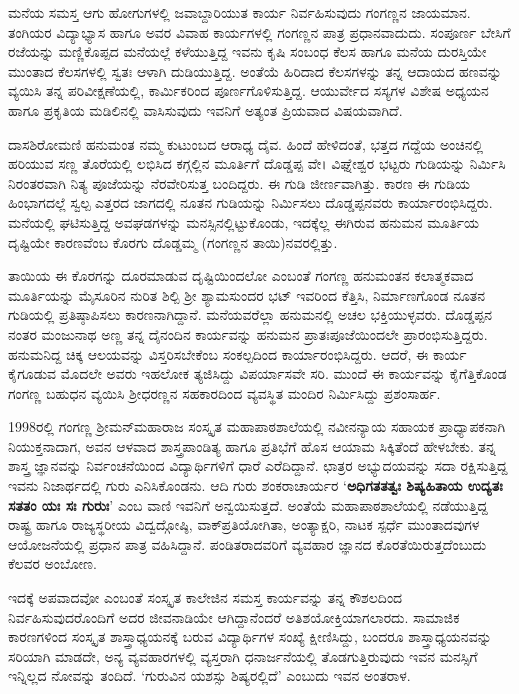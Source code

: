 {ಮನೆಯ ಸಮಸ್ತ ಆಗು  \enginline{-}  ಹೋಗುಗಳಲ್ಲಿ ಜವಾಬ್ದಾರಿಯುತ ಕಾರ್ಯ ನಿರ್ವಹಿಸುವುದು ಗಂಗಣ್ಣನ ಜಾಯಮಾನ. ತಂಗಿಯರ ವಿದ್ಯಾಭ್ಯಾಸ ಹಾಗೂ ಅವರ ವಿವಾಹ ಕಾರ್ಯಗಳಲ್ಲಿ ಗಂಗಣ್ಣನ ಪಾತ್ರ ಪ್ರಧಾನವಾದುದು. ಸಂಪೂರ್ಣ ಬೇಸಿಗೆ ರಜೆಯನ್ನು ಮಣ್ಣಿಕೊಪ್ಪದ ಮನೆಯಲ್ಲೆ ಕಳೆಯುತ್ತಿದ್ದ ಇವನು ಕೃಷಿ ಸಂಬಂಧ ಕೆಲಸ ಹಾಗೂ ಮನೆಯ ದುರಸ್ತಿಯೇ ಮುಂತಾದ ಕೆಲಸಗಳಲ್ಲಿ ಸ್ವತಃ ಆಳಾಗಿ ದುಡಿಯುತ್ತಿದ್ದ. ಅಂತೆಯೆ ಹಿರಿದಾದ ಕೆಲಸಗಳನ್ನು ತನ್ನ ಆದಾಯದ ಹಣವನ್ನು ವ್ಯಯಿಸಿ ತನ್ನ ಪರಿವೀಕ್ಷಣೆಯಲ್ಲಿ, ಕಾರ್ಮಿಕರಿಂದ ಪೂರ್ಣಗೊಳಿಸುತ್ತಿದ್ದ. ಆಯುರ್ವೇದ ಸಸ್ಯಗಳ ವಿಶೇಷ ಅಧ್ಯಯನ ಹಾಗೂ ಪ್ರಕೃತಿಯ ಮಡಿಲಿನಲ್ಲಿ ವಾಸಿಸುವುದು ಇವನಿಗೆ ಅತ್ಯಂತ ಪ್ರಿಯವಾದ ವಿಷಯವಾಗಿದೆ.

ದಾಸಶಿರೋಮಣಿ ಹನುಮಂತ ನಮ್ಮ ಕುಟುಂಬದ ಆರಾಧ್ಯ ದೈವ. ಹಿಂದೆ ಹೇಳಿದಂತೆ, ಭತ್ತದ ಗದ್ದೆಯ ಅಂಚಿನಲ್ಲಿ ಹರಿಯುವ ಸಣ್ಣ ತೊರೆಯಲ್ಲಿ ಲಭಿಸಿದ ಕಗ್ಗಲ್ಲಿನ ಮೂರ್ತಿಗೆ ದೊಡ್ಡಪ್ಪ ವೇ। ವಿಘ್ನೇಶ್ವರ ಭಟ್ಟರು ಗುಡಿಯನ್ನು ನಿರ್ಮಿಸಿ ನಿರಂತರವಾಗಿ ನಿತ್ಯ ಪೂಜೆಯನ್ನು ನೆರವೇರಿಸುತ್ತ ಬಂದಿದ್ದರು. ಈ ಗುಡಿ ಜೀರ್ಣವಾಗಿತ್ತು. ಕಾರಣ ಈ ಗುಡಿಯ ಹಿಂಭಾಗದಲ್ಲೆ ಸ್ವಲ್ಪ ಎತ್ತರದ ಜಾಗದಲ್ಲಿ ನೂತನ ಗುಡಿಯನ್ನು ನಿರ್ಮಿಸಲು ದೊಡ್ಡಪ್ಪನವರು ಕಾರ್ಯಾರಂಭಿಸಿದ್ದರು. ಮನೆಯಲ್ಲಿ ಘಟಿಸುತ್ತಿದ್ದ ಅವಘಡಗಳನ್ನು ಮನಸ್ಸಿನಲ್ಲಿಟ್ಟುಕೊಂಡು, ಇದಕ್ಕೆಲ್ಲ ಈಗಿರುವ ಹನುಮನ ಮೂರ್ತಿಯ ದೃಷ್ಟಿಯೇ ಕಾರಣವೆಂಬ ಕೊರಗು ದೊಡ್ಡಮ್ಮ (ಗಂಗಣ್ಣನ ತಾಯಿ)ನವರಲ್ಲಿತ್ತು. 

ತಾಯಿಯ ಈ ಕೊರಗನ್ನು ದೂರಮಾಡುವ ದೃಷ್ಟಿಯಿಂದಲೋ ಎಂಬಂತೆ ಗಂಗಣ್ಣ ಹನುಮಂತನ ಕಲಾತ್ಮಕವಾದ ಮೂರ್ತಿಯನ್ನು ಮೈಸೂರಿನ ನುರಿತ ಶಿಲ್ಪಿ ಶ್ರೀ ಶ್ಯಾಮಸುಂದರ ಭಟ್ ಇವರಿಂದ ಕೆತ್ತಿಸಿ, ನಿರ್ಮಾಣಗೊಂಡ ನೂತನ ಗುಡಿಯಲ್ಲಿ ಪ್ರತಿಷ್ಠಾಪಿಸಲು ಕಾರಣನಾಗಿದ್ದಾನೆ. ಮನೆಯವರೆಲ್ಲಾ ಹನುಮನಲ್ಲಿ ಅಚಲ ಭಕ್ತಿಯುಳ್ಳವರು. ದೊಡ್ಡಪ್ಪನ ನಂತರ ಮಂಜುನಾಥ ಅಣ್ಣ ತನ್ನ ದೈನಂದಿನ ಕಾರ್ಯವನ್ನು ಹನುಮನ ಪ್ರಾತಃಪೂಜೆಯಿಂದಲೇ ಪ್ರಾರಂಭಿಸುತ್ತಿದ್ದರು. ಹನುಮನಿದ್ದ ಚಿಕ್ಕ ಆಲಯವನ್ನು ವಿಸ್ತರಿಸಬೇಕೆಂಬ ಸಂಕಲ್ಪದಿಂದ ಕಾರ್ಯಾರಂಭಿಸಿದ್ದರು. ಆದರೆ, ಈ ಕಾರ್ಯ ಕೈಗೂಡುವ ಮೊದಲೇ ಅವರು ಇಹಲೋಕ ತ್ಯಜಿಸಿದ್ದು ವಿಪರ್ಯಾಸವೇ ಸರಿ. ಮುಂದೆ ಈ ಕಾರ್ಯವನ್ನು ಕೈಗೆತ್ತಿಕೊಂಡ ಗಂಗಣ್ಣ ಬಹುಧನ ವ್ಯಯಿಸಿ ಶ್ರೀಧರಣ್ಣನ ಸಹಕಾರದಿಂದ ವ್ಯವಸ್ಥಿತ ಮಂದಿರ ನಿರ್ಮಿಸಿದ್ದು ಪ್ರಶಂಸಾರ್ಹ.

1998ರಲ್ಲಿ ಗಂಗಣ್ಣ ಶ್ರೀಮನ್‍ಮಹಾರಾಜ ಸಂಸ್ಕೃತ ಮಹಾಪಾಠಶಾಲೆಯಲ್ಲಿ ನವೀನನ್ಯಾಯ ಸಹಾಯಕ ಪ್ರಾಧ್ಯಾಪಕನಾಗಿ ನಿಯುಕ್ತನಾದಾಗ, ಅವನ ಆಳವಾದ ಶಾಸ್ತ್ರಪಾಂಡಿತ್ಯ ಹಾಗೂ ಪ್ರತಿಭೆಗೆ ಹೊಸ ಆಯಾಮ ಸಿಕ್ಕಿತೆಂದೆ ಹೇಳಬೇಕು. ತನ್ನ ಶಾಸ್ತ್ರ ಜ್ಞಾನವನ್ನು ನಿರ್ವಂಚನೆಯಿಂದ ವಿದ್ಯಾರ್ಥಿಗಳಿಗೆ ಧಾರೆ ಎರೆದಿದ್ದಾನೆ. ಛಾತ್ರರ ಅಭ್ಯುದಯವನ್ನು ಸದಾ ರಕ್ಷಿಸುತ್ತಿದ್ದ  ಇವನು ನಿಜಾರ್ಥದಲ್ಲಿ ಗುರು ಎನಿಸಿಕೊಂಡನು. ಆದಿ ಗುರು ಶಂಕರಾಚಾರ್ಯರ   \enginline{-}   ‘\textbf{ಅಧಿಗತತತ್ವಃ ಶಿಷ್ಯಹಿತಾಯ ಉದ್ಯತಃ ಸತತಂ ಯಃ ಸಃ ಗುರುಃ}’ ಎಂಬ ವಾಣಿ ಇವನಿಗೆ ಅನ್ವಯಿಸುತ್ತದೆ. ಅಂತೆಯೆ ಮಹಾಪಾಠಶಾಲೆಯಲ್ಲಿ ನಡೆಯುತ್ತಿದ್ದ ರಾಷ್ಟ್ರ ಹಾಗೂ ರಾಜ್ಯಸ್ಥರೀಯ ವಿದ್ವದ್ಗೋಷ್ಠಿ, ವಾಕ್‍ಪ್ರತಿಯೋಗಿತಾ, ಅಂತ್ಯಾಕ್ಷರಿ, ನಾಟಕ ಸ್ಪರ್ಧೆ ಮುಂತಾದವುಗಳ ಆಯೋಜನೆಯಲ್ಲಿ ಪ್ರಧಾನ ಪಾತ್ರ ವಹಿಸಿದ್ದಾನೆ. ಪಂಡಿತರಾದವರಿಗೆ ವ್ಯವಹಾರ ಜ್ಞಾನದ ಕೊರತೆಯಿರುತ್ತದೆಂಬುದು ಕೆಲವರ ಅಂಬೋಣ. 

ಇದಕ್ಕೆ ಅಪವಾದವೋ ಎಂಬಂತೆ ಸಂಸ್ಕೃತ ಕಾಲೇಜಿನ ಸಮಸ್ತ ಕಾರ್ಯವನ್ನು ತನ್ನ ಕೌಶಲದಿಂದ ನಿರ್ವಹಿಸುವುದರೊಂದಿಗೆ ಅದರ ಜೀವನಾಡಿಯೇ ಆಗಿದ್ದಾನೆಂದರೆ ಅತಿಶಯೋಕ್ತಿಯಾಗಲಾರದು. ಸಾಮಾಜಿಕ ಕಾರಣಗಳಿಂದ ಸಂಸ್ಕೃತ ಶಾಸ್ತ್ರಾಧ್ಯಯನಕ್ಕೆ ಬರುವ ವಿದ್ಯಾರ್ಥಿಗಳ ಸಂಖ್ಯೆ ಕ್ಷೀಣಿಸಿದ್ದು, ಬಂದರೂ ಶಾಸ್ತ್ರಾಧ್ಯಯನವನ್ನು ಸರಿಯಾಗಿ ಮಾಡದೇ, ಅನ್ಯ ವ್ಯವಹಾರಗಳಲ್ಲಿ ವ್ಯಸ್ತರಾಗಿ ಧನಾರ್ಜನೆಯಲ್ಲಿ ತೊಡಗುತ್ತಿರುವುದು ಇವನ ಮನಸ್ಸಿಗೆ ಇನ್ನಿಲ್ಲದ ನೋವನ್ನು ತಂದಿದೆ. ‘ಗುರುವಿನ ಯಶಸ್ಸು ಶಿಷ್ಯರಲ್ಲಿದೆ’ ಎಂಬುದು ಇವನ ಅಂತರಾಳ.

}
